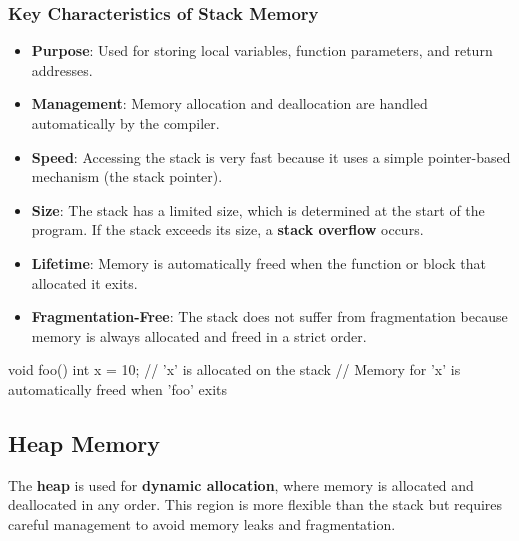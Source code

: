 \subsubsection{Key Characteristics of Stack Memory}
\begin{itemize}
    \item \textbf{Purpose}: Used for storing local variables, function parameters, and return addresses.
    \item \textbf{Management}: Memory allocation and deallocation are handled automatically by the compiler.
    \item \textbf{Speed}: Accessing the stack is very fast because it uses a simple pointer-based mechanism (the stack pointer).
    \item \textbf{Size}: The stack has a limited size, which is determined at the start of the program. If the stack exceeds its size, a \textbf{stack overflow} occurs.
    \item \textbf{Lifetime}: Memory is automatically freed when the function or block that allocated it exits.
    \item \textbf{Fragmentation-Free}: The stack does not suffer from fragmentation because memory is always allocated and freed in a strict order.
\end{itemize}

\begin{exampleblock}
    \begin{codeblock}[language=C++]
void foo() {
    int x = 10; // 'x' is allocated on the stack
    // Memory for 'x' is automatically freed when 'foo' exits
}
    \end{codeblock}
\end{exampleblock}

\subsection{Heap Memory}

The \textbf{heap} is used for \textbf{dynamic allocation}, where memory is allocated and deallocated in any order. This region is more flexible than the stack but requires careful management to avoid memory leaks and fragmentation.

